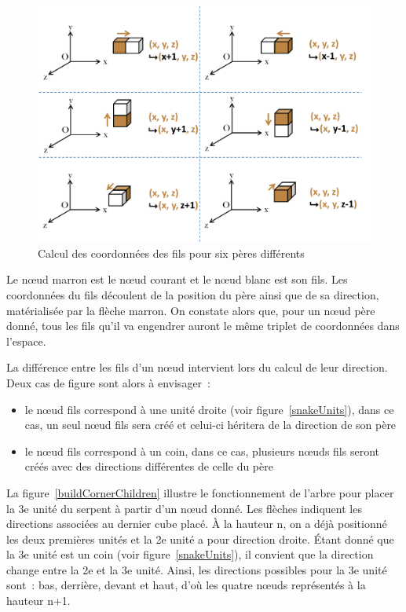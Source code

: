 \begin{figure}[h]
 \centering
 \includegraphics[scale=0.5,keepaspectratio=true]{img/buildChildren.png}
 \caption{Calcul des coordonnées des fils pour six pères différents}
 \label{buildChildren}
\end{figure}

\newpage

Le nœud marron est le nœud courant et le nœud blanc est son fils. Les coordonnées du fils découlent de la position du père ainsi que de sa direction, matérialisée par la flèche marron. On constate alors que, pour un nœud père donné, tous les fils qu’il va engendrer auront le même triplet de coordonnées dans l’espace.


La différence entre les fils d’un nœud intervient lors du calcul de leur direction. Deux cas de figure sont alors à envisager :
\begin{itemize}
 \item le nœud fils correspond à une unité droite (voir figure~\ref{snakeUnits}), dans ce cas, un seul nœud fils sera créé et celui-ci héritera de la direction de son père
 \item le nœud fils correspond à un coin, dans ce cas, plusieurs nœuds fils seront créés avec des directions différentes de celle du père
\end{itemize}
 
La figure~\ref{buildCornerChildren} illustre le fonctionnement de l’arbre pour placer la 3e unité du serpent à partir d’un nœud donné. Les flèches indiquent les directions associées au dernier cube placé. À la hauteur n, on a déjà positionné les deux premières unités et la 2e unité a pour direction droite.  Étant donné que la 3e unité est un coin (voir figure~\ref{snakeUnits}), il convient que la direction change entre la 2e et la 3e unité. Ainsi, les directions possibles pour la 3e unité sont : bas, derrière, devant et haut, d’où les quatre nœuds représentés à la hauteur n+1. 

